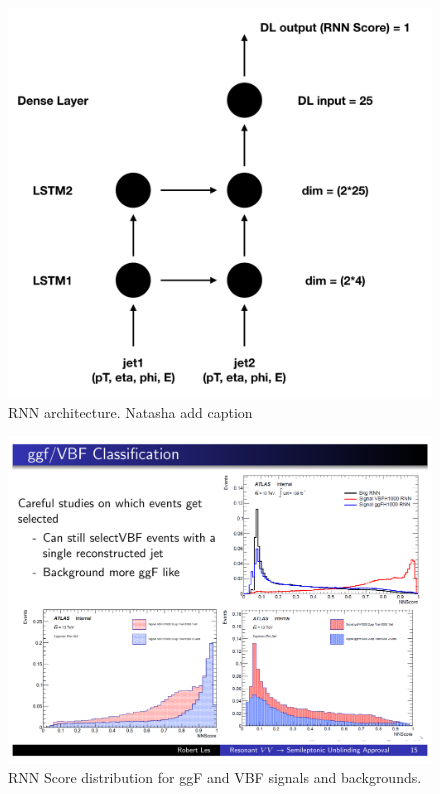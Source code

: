 \begin{figure}[h!]
  \centering
  \includegraphics[width=\hsize]{figures/Analysis/rnn_architecture.png}
  \caption{RNN architecture. Natasha add caption} 
  \label{fig:rnn_architecture}
\end{figure}
\FloatBarrier


\begin{figure}[h!]
  \centering
  \includegraphics[width=\hsize]{figures/Analysis/rnn.pdf}
  \caption{RNN Score distribution for ggF and VBF signals and backgrounds.} 
  \label{fig:rnn_score}
\end{figure}
\FloatBarrier



